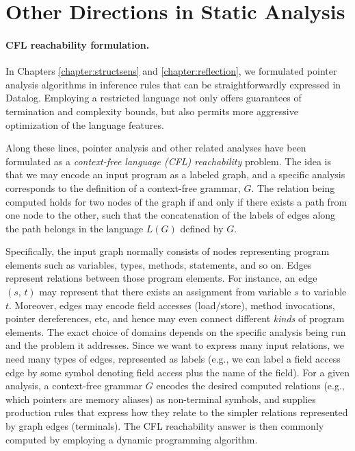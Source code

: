 \section{Other Directions in Static Analysis}
\label{related:sect/misc}


\paragraph{CFL reachability formulation.} In Chapters
\ref{chapter:structsens} and \ref{chapter:reflection}, we formulated
pointer analysis algorithms in inference rules that can be
straightforwardly expressed in Datalog. Employing a restricted
language not only offers guarantees of termination and complexity
bounds, but also permits more aggressive optimization of the language
features.

Along these lines, pointer analysis and other related analyses have
been formulated as a \emph{context-free language (CFL) reachability}
problem. The idea is that we may encode an input program as a labeled
graph, and a specific analysis corresponds to the definition of a
context-free grammar, \(G\). The relation being computed holds for two
nodes of the graph if and only if there exists a path from one node to
the other, such that the concatenation of the labels of edges along
the path belongs in the language \(L(G)\) defined by \(G\).

Specifically, the input graph normally consists of nodes representing
program elements such as variables, types, methods, statements, and so
on. Edges represent relations between those program elements. For
instance, an edge \((s,\,t)\) may represent that there exists an
assignment from variable \(s\) to variable \(t\). Moreover, edges may
encode field accesses (load/store), method invocations, pointer
dereferences, etc, and hence may even connect different \emph{kinds}
of program elements. The exact choice of domains depends on the
specific analysis being run and the problem it addresses. Since we
want to express many input relations, we need many types of edges,
represented as labels (e.g., we can label a field access edge by some
symbol denoting field access plus the name of the field).  For a given
analysis, a context-free grammar \(G\) encodes the desired computed
relations (e.g., which pointers are memory aliases) as non-terminal
symbols, and supplies production rules that express how they relate to
the simpler relations represented by graph edges (terminals). The CFL
reachability answer is then commonly computed by employing a dynamic
programming algorithm.

